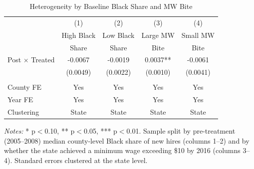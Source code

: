 
\begin{table}[H]
\centering
\caption{Heterogeneity by Baseline Black Share and MW Bite}
\label{tab:het}
\begin{threeparttable}
\begin{tabular}{lcccc}
\toprule
 & (1) & (2) & (3) & (4) \\
 & High Black & Low Black & Large MW & Small MW \\
 & Share & Share & Bite & Bite \\
\midrule
Post $\times$ Treated & -0.0067 & -0.0019 & 0.0037** & -0.0061 \\
 & (0.0049) & (0.0022) & (0.0010) & (0.0041) \\
\\
County FE & Yes & Yes & Yes & Yes \\
Year FE & Yes & Yes & Yes & Yes \\
Clustering & State & State & State & State \\
\bottomrule
\end{tabular}
\begin{tablenotes}[flushleft]
\small
\item \textit{Notes:} * p$<$0.10, ** p$<$0.05, *** p$<$0.01. Sample split by pre-treatment (2005--2008) median county-level Black share of new hires (columns 1--2) and by whether the state achieved a minimum wage exceeding \$10 by 2016 (columns 3--4). Standard errors clustered at the state level.
\end{tablenotes}
\end{threeparttable}
\end{table}

